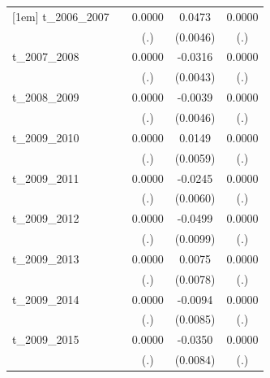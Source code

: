 \begin{table}[htbp]
\begin{tabular}{l*{4}{c}}
[1em]
t\_2006\_2007 &                     &      0.0000         &      0.0473\sym{***}&      0.0000         \\
            &                     &         (.)         &    (0.0046)         &         (.)         \\
[1em]
t\_2007\_2008 &                     &      0.0000         &     -0.0316\sym{***}&      0.0000         \\
            &                     &         (.)         &    (0.0043)         &         (.)         \\
[1em]
t\_2008\_2009 &                     &      0.0000         &     -0.0039         &      0.0000         \\
            &                     &         (.)         &    (0.0046)         &         (.)         \\
[1em]
t\_2009\_2010 &                     &      0.0000         &      0.0149\sym{**} &      0.0000         \\
            &                     &         (.)         &    (0.0059)         &         (.)         \\
[1em]
t\_2009\_2011 &                     &      0.0000         &     -0.0245\sym{***}&      0.0000         \\
            &                     &         (.)         &    (0.0060)         &         (.)         \\
[1em]
t\_2009\_2012 &                     &      0.0000         &     -0.0499\sym{***}&      0.0000         \\
            &                     &         (.)         &    (0.0099)         &         (.)         \\
[1em]
t\_2009\_2013 &                     &      0.0000         &      0.0075         &      0.0000         \\
            &                     &         (.)         &    (0.0078)         &         (.)         \\
[1em]
t\_2009\_2014 &                     &      0.0000         &     -0.0094         &      0.0000         \\
            &                     &         (.)         &    (0.0085)         &         (.)         \\
[1em]
t\_2009\_2015 &                     &      0.0000         &     -0.0350\sym{***}&      0.0000         \\
            &                     &         (.)         &    (0.0084)         &         (.)         \\

\end{tabular}
\end{table}
